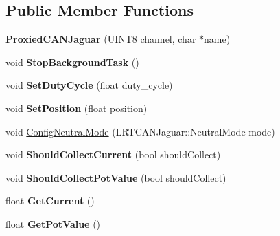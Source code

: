 \subsection*{\-Public \-Member \-Functions}
\begin{DoxyCompactItemize}
\item 
\hypertarget{class_proxied_c_a_n_jaguar_a32328bd41979387330bff371f15236d1}{
{\bfseries \-Proxied\-C\-A\-N\-Jaguar} (\-U\-I\-N\-T8 channel, char $\ast$name)}
\label{class_proxied_c_a_n_jaguar_a32328bd41979387330bff371f15236d1}

\item 
\hypertarget{class_proxied_c_a_n_jaguar_a87bf28a17f22d6138507dad840961294}{
void {\bfseries \-Stop\-Background\-Task} ()}
\label{class_proxied_c_a_n_jaguar_a87bf28a17f22d6138507dad840961294}

\item 
\hypertarget{class_proxied_c_a_n_jaguar_a3bda0ead0f6cdde2432c0121926971d9}{
void {\bfseries \-Set\-Duty\-Cycle} (float duty\-\_\-cycle)}
\label{class_proxied_c_a_n_jaguar_a3bda0ead0f6cdde2432c0121926971d9}

\item 
\hypertarget{class_proxied_c_a_n_jaguar_a8a2c8a334070414dbbcd8b49141110ef}{
void {\bfseries \-Set\-Position} (float position)}
\label{class_proxied_c_a_n_jaguar_a8a2c8a334070414dbbcd8b49141110ef}

\item 
void \hyperlink{class_proxied_c_a_n_jaguar_ad48392e718aa8b168b587d368a7f6e1b}{\-Config\-Neutral\-Mode} (\-L\-R\-T\-C\-A\-N\-Jaguar\-::\-Neutral\-Mode mode)
\item 
\hypertarget{class_proxied_c_a_n_jaguar_ac19b1478c63b6f64aafd14b0f76725e1}{
void {\bfseries \-Should\-Collect\-Current} (bool should\-Collect)}
\label{class_proxied_c_a_n_jaguar_ac19b1478c63b6f64aafd14b0f76725e1}

\item 
\hypertarget{class_proxied_c_a_n_jaguar_a265fc31645a41901ea22adfa96a4fb35}{
void {\bfseries \-Should\-Collect\-Pot\-Value} (bool should\-Collect)}
\label{class_proxied_c_a_n_jaguar_a265fc31645a41901ea22adfa96a4fb35}

\item 
\hypertarget{class_proxied_c_a_n_jaguar_a58d3f8f8b6491314273ad23af9cc7ffc}{
float {\bfseries \-Get\-Current} ()}
\label{class_proxied_c_a_n_jaguar_a58d3f8f8b6491314273ad23af9cc7ffc}

\item 
\hypertarget{class_proxied_c_a_n_jaguar_acaea00d479f726087d7272bf4948f8d7}{
float {\bfseries \-Get\-Pot\-Value} ()}
\label{class_proxied_c_a_n_jaguar_acaea00d479f726087d7272bf4948f8d7}


\end{DoxyCompactItemize}
